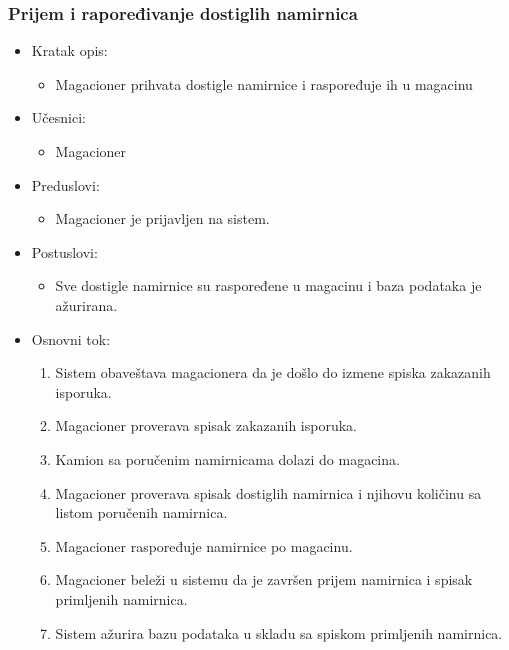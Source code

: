 
\subsubsection{Prijem i rapoređivanje dostiglih namirnica}

	\begin{itemize}
		\item{Kratak opis:} 
		\begin{itemize}
			\item{Magacioner prihvata dostigle namirnice i raspoređuje ih u magacinu}
		\end{itemize}
		\item{Učesnici:} 
		\begin{itemize}
			\item{Magacioner}
		\end{itemize}		
		
		\item{Preduslovi:}
		\begin{itemize}
			\item{Magacioner je prijavljen na sistem.}
		\end{itemize}
		
		\item{Postuslovi:}
		\begin{itemize}
			\item{Sve dostigle namirnice su raspoređene u magacinu i baza podataka je ažurirana.}
		\end{itemize}
		
		\item{Osnovni tok:}
		\begin{enumerate}
			\item{Sistem obaveštava magacionera da je došlo do izmene spiska zakazanih isporuka.}
			\item{Magacioner proverava spisak zakazanih isporuka.}
			\item{Kamion sa poručenim namirnicama dolazi do magacina.}
			\item{Magacioner proverava spisak dostiglih namirnica i njihovu količinu sa listom poručenih namirnica.}
			\item{Magacioner raspoređuje namirnice po magacinu.}
			\item{Magacioner beleži u sistemu da je završen prijem namirnica i spisak primljenih namirnica.}
			\item{Sistem ažurira bazu podataka u skladu sa spiskom primljenih namirnica.}
		\end{enumerate}
		

\end{itemize}
